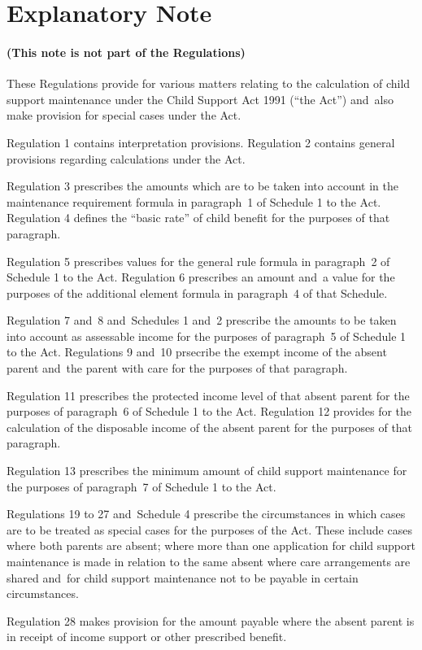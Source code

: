 \documentclass[12pt,a4paper]{article}
\begin{document}
\vfill

\part{Explanatory Note}

\renewcommand\parthead{--- Explanatory Note}

\subsection*{(This note is not part of the Regulations)}

These Regulations provide for various matters relating to the calculation of child support maintenance under the Child Support Act 1991 (“the Act”) and~also make provision for special cases under the Act.

Regulation 1 contains interpretation provisions. Regulation 2 contains general provisions regarding calculations under the Act.

Regulation 3 prescribes the amounts which are to be taken into account in the maintenance requirement formula in paragraph~1 of Schedule 1 to the Act. Regulation 4 defines the “basic rate” of child benefit for the purposes of that paragraph.

Regulation 5 prescribes values for the general rule formula in paragraph~2 of Schedule 1 to the Act. Regulation 6 prescribes an amount and~a value for the purposes of the additional element formula in paragraph~4 of that Schedule.

Regulation 7 and~8 and~Schedules 1 and~2 prescribe the amounts to be taken into account as assessable income for the purposes of paragraph~5 of Schedule 1 to the Act. Regulations 9 and~10 prsecribe the exempt income of the absent parent and~the parent with care for the purposes of that paragraph.

Regulation 11 prescribes the protected income level of that absent parent for the purposes of paragraph~6 of Schedule 1 to the Act. Regulation 12 provides for the calculation of the disposable income of the absent parent for the purposes of that paragraph.

Regulation 13 prescribes the minimum amount of child support maintenance for the purposes of paragraph~7 of Schedule 1 to the Act.

Regulations 19 to 27 and~Schedule 4 prescribe the circumstances in which cases are to be treated as special cases for the purposes of the Act. These include cases where both parents are absent; where more than one application for child support maintenance is made in relation to the same absent where care arrangements are shared and~for child support maintenance not to be payable in certain circumstances.

Regulation 28 makes provision for the amount payable where the absent parent is in receipt of income support or other prescribed benefit. 
\end{document}

